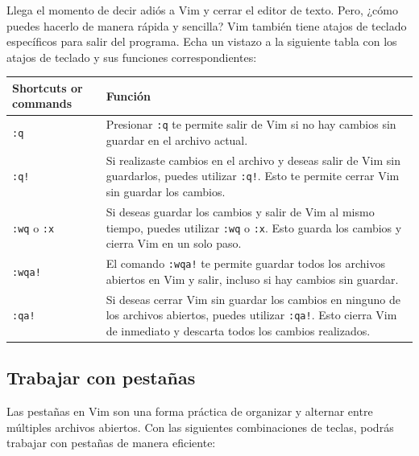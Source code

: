 \documentclass[
  doc,
  floatsintext,
  longtable,
  a4paper,
  nolmodern,
  notxfonts,
  notimes,
  12pt,
  colorlinks=true,linkcolor=blue,citecolor=blue,urlcolor=blue]{apa7}
\newcounter{none} %
\begin{document}
Llega el momento de decir adiós a Vim y cerrar el editor de texto. Pero,
¿cómo puedes hacerlo de manera rápida y sencilla? Vim también tiene
atajos de teclado específicos para salir del programa. Echa un vistazo a
la siguiente tabla con los atajos de teclado y sus funciones
correspondientes:

{\def\LTcaptype{none} %
\begin{longtable}[]{@{}
  >{\raggedright\arraybackslash}p{}
  >{\raggedright\arraybackslash}p{}@{}}
\toprule\noalign{}
\begin{minipage}[b]{\linewidth}\raggedright
Shortcuts or commands
\end{minipage} & \begin{minipage}[b]{\linewidth}\raggedright
Función
\end{minipage} \\
\midrule\noalign{}
\endhead
\bottomrule\noalign{}
\endlastfoot
\texttt{:q} & Presionar \texttt{:q} te permite salir de Vim si no hay
cambios sin guardar en el archivo actual. \\
\texttt{:q!} & Si realizaste cambios en el archivo y deseas salir de Vim
sin guardarlos, puedes utilizar \texttt{:q!}. Esto te permite cerrar Vim
sin guardar los cambios. \\
\texttt{:wq} o \texttt{:x} & Si deseas guardar los cambios y salir de
Vim al mismo tiempo, puedes utilizar \texttt{:wq} o \texttt{:x}. Esto
guarda los cambios y cierra Vim en un solo paso. \\
\texttt{:wqa!} & El comando \texttt{:wqa!} te permite guardar todos los
archivos abiertos en Vim y salir, incluso si hay cambios sin guardar. \\
\texttt{:qa!} & Si deseas cerrar Vim sin guardar los cambios en ninguno
de los archivos abiertos, puedes utilizar \texttt{:qa!}. Esto cierra Vim
de inmediato y descarta todos los cambios realizados. \\
\end{longtable}
}

\subsection{Trabajar con pestañas}\label{trabajar-con-pestauxf1as}

Las pestañas en Vim son una forma práctica de organizar y alternar entre
múltiples archivos abiertos. Con las siguientes combinaciones de teclas,
podrás trabajar con pestañas de manera eficiente:
\end{document}
